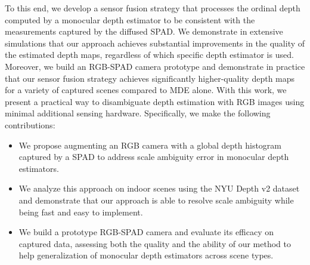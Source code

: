 
To this end, we develop a sensor fusion strategy that processes the ordinal depth computed by a monocular depth estimator to be consistent with the measurements captured by the diffused SPAD. We demonstrate in extensive simulations that our approach achieves substantial improvements in the quality of the estimated depth maps, regardless of which specific depth estimator is used. Moreover, we build an RGB-SPAD camera prototype and demonstrate in practice that our sensor fusion strategy achieves significantly higher-quality depth maps for a variety of captured scenes compared to MDE alone. With this work, we present a practical way to disambiguate depth estimation with RGB images using minimal additional sensing hardware. Specifically, we make the following contributions:
%
\begin{itemize}
	\item We propose augmenting an RGB camera with a global depth histogram captured by a SPAD to address scale ambiguity error in monocular depth estimators.	
  \item We analyze this approach on indoor scenes using the NYU Depth v2 dataset and demonstrate that our approach is able to resolve scale ambiguity while being fast and easy to implement.
	\item We build a prototype RGB-SPAD camera and evaluate its efficacy on captured data, assessing both the quality and the ability of our method to help generalization of monocular depth estimators across scene types. 
\end{itemize}


